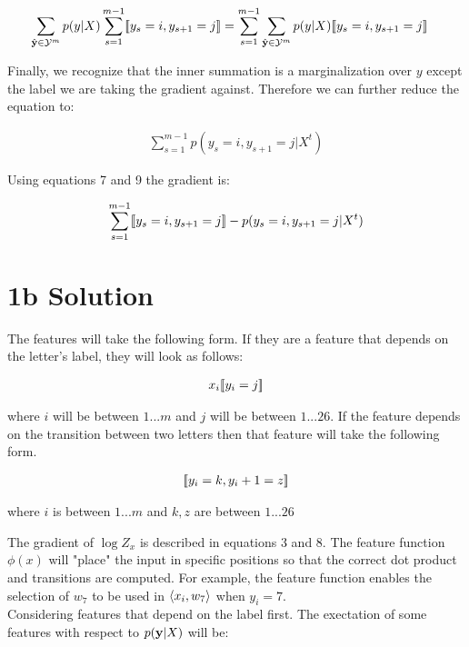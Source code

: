 \documentclass[11pt]{report}
\begin{document}
	\begin{align}
	\sum_{\hat{\mathbf{\boldsymbol{y}}} \in \mathcal{Y}^m} p(y|X) \sum_{s=1}^{m-1} [\![y_s = i, y_{s+1} = j]\!] &= \sum_{s=1}^{m-1}  \sum_{\hat{\mathbf{\boldsymbol{y}}} \in \mathcal{Y}^m}   p(y|X)[\![y_s = i, y_{s+1} = j]\!]
	\end{align}


	Finally, we recognize that the inner summation is a marginalization over $y$ except the label we are taking the gradient against. Therefore we can further reduce the equation to:

	\begin{align}
	 \sum_{s=1}^{m-1} {p(y_s=i, y_{s+1}=j | X^t)}
	\end{align}


	Using equations 7 and 9 the gradient is:

	\begin{align}
	\sum_{s=1}^{m-1} [\![y_s = i, y_{s+1} = j]\!] - p(y_s=i, y_{s+1}=j | X^t)
	\end{align}
	

\section*{1b Solution}

The features will take the following form. If they are a feature that depends on the letter's label, they will look as follows:


	\begin{align}
	x_i [\![y_i=j]\!]
	\end{align}

where $i$ will be between $1...m$ and $j$ will be between $1...26$. If the feature depends on the transition between two letters then that feature will take the following form. 


	\begin{align}
	[\![y_i = k, y_i+1 = z]\!]
	\end{align}

where $i$ is between $1...m$ and $k, z$ are between $1...26$

The gradient of $\log Z_x$ is described in equations 3 and 8. The feature function $\phi(x)$ will "place" the input in specific positions so that the correct dot product and transitions are computed. 
For example, the feature function enables the selection of $w_7$ to be used in $\left\langle x_i,w_7 \right\rangle$ when $y_i = 7$. \\

Considering features that depend on the label first. The exectation of some features with respect to $p(\mathbf{\boldsymbol{y}}|X)$ will be:
\end{document}
